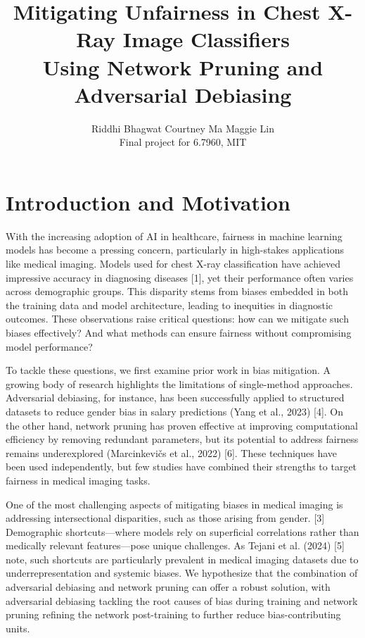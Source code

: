 \documentclass[11pt]{article}
\title{\textbf{Mitigating Unfairness in Chest X-Ray Image Classifiers\\
Using Network Pruning and Adversarial Debiasing}}
\author{
  Riddhi Bhagwat \quad Courtney Ma \quad Maggie Lin \\[4pt]
  \small Final project for 6.7960, MIT
}
\date{}
\begin{document}
\maketitle
\tableofcontents
\newpage

\section{Introduction and Motivation}

With the increasing adoption of AI in healthcare, fairness in machine learning models has become a pressing concern, particularly in high-stakes applications like medical imaging. Models used for chest X-ray classification have achieved impressive accuracy in diagnosing diseases [1], yet their performance often varies across demographic groups. This disparity stems from biases embedded in both the training data and model architecture, leading to inequities in diagnostic outcomes. These observations raise critical questions: how can we mitigate such biases effectively? And what methods can ensure fairness without compromising model performance?

To tackle these questions, we first examine prior work in bias mitigation. A growing body of research highlights the limitations of single-method approaches. Adversarial debiasing, for instance, has been successfully applied to structured datasets to reduce gender bias in salary predictions (Yang et al., 2023) [4]. On the other hand, network pruning has proven effective at improving computational efficiency by removing redundant parameters, but its potential to address fairness remains underexplored (Marcinkevi\v{c}s et al., 2022) [6]. These techniques have been used independently, but few studies have combined their strengths to target fairness in medical imaging tasks.

One of the most challenging aspects of mitigating biases in medical imaging is addressing intersectional disparities, such as those arising from gender. [3] Demographic shortcuts---where models rely on superficial correlations rather than medically relevant features---pose unique challenges. As Tejani et al. (2024) [5] note, such shortcuts are particularly prevalent in medical imaging datasets due to underrepresentation and systemic biases. We hypothesize that the combination of adversarial debiasing and network pruning can offer a robust solution, with adversarial debiasing tackling the root causes of bias during training and network pruning refining the network post-training to further reduce bias-contributing units.
\end{document}
